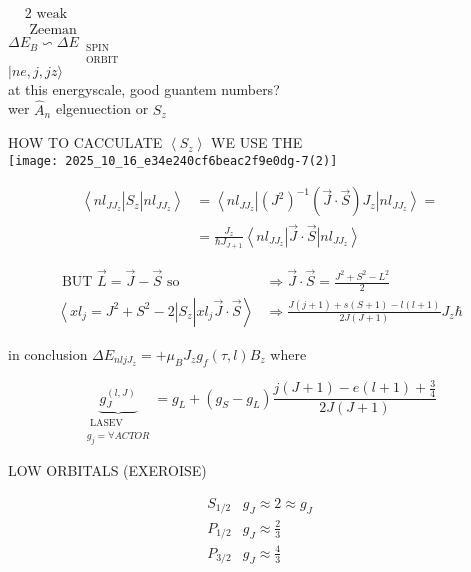 $\begin{aligned} & 2 \text { weak } \\ & \text { Zeeman }\end{aligned}$\\
$\Delta E_{B} \backsim \Delta E_{\substack{\text { SPIN } \\ \text { ORBIT }}}$\\
$|n e, j, j z\rangle$\\
at this energyscale, good guantem numbers?\\
wer $\hat{A}_{n}$ elgenuection or $S_{z}$

HOW TO CACCULATE $\left\langle S_{z}\right\rangle$ WE USE THE\\
\texttt{[image: 2025\_10\_16\_e34e240cf6beac2f9e0dg-7(2)]}

$$
\begin{aligned}
\left\langle n l_{J J_{z}}\right| S_{z}\left|n l_{J J_{z}}\right\rangle & =\left\langle n l_{J J_{z}}\right|\left(J^{2}\right)^{-1}(\vec{J} \cdot \vec{S}) J_{z}\left|n l_{J J_{z}}\right\rangle= \\
& =\frac{J_{z}}{\hbar J_{J+1}}\left\langle n l_{J J_{z}}\right| \vec{J} \cdot \vec{S}\left|n l_{J J_{z}}\right\rangle
\end{aligned}
$$

$$
\begin{array}{ll}
\text { BUT } \vec{L}=\vec{J}-\vec{S} \text { so } & \Rightarrow \vec{J} \cdot \vec{S}=\frac{J^{2}+S^{2}-L^{2}}{2} \\
\left\langle x l_{j}=J^{2}+S^{2}-2\right| S_{z}\left|x l_{j} \vec{J} \cdot \vec{S}\right\rangle & \Rightarrow \frac{J(j+1)+s(S+1)-l(l+1)}{2 J(J+1)} J_{z} \hbar
\end{array}
$$

in conclusion $\Delta E_{n l j J_{z}}=+\mu_{B} J_{z} g_{f}(\tau, l) B_{z}$ where

$$
\underbrace{g_{J}^{(l, J)}}_{\substack{\text { LASEV } \\ g_{j}=\forall A C T O R}}=g_{L}+\left(g_{S}-g_{L}\right) \frac{j(J+1)-e(l+1)+\frac{3}{4}}{2 J(J+1)}
$$

LOW ORBITALS (EXEROISE)

$$
\begin{array}{ll}
S_{1 / 2} & g_{J} \approx 2 \approx g_{J} \\
P_{1 / 2} & g_{J} \approx \frac{2}{3} \\
P_{3 / 2} & g_{J} \approx \frac{4}{3}
\end{array}
$$

